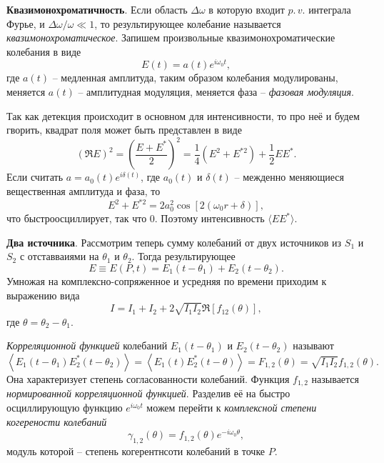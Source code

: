 

\textbf{Квазимонохроматичность}. 
Если область $\Delta \omega$ в которую входит $p.\, v.$ интеграла Фурье, и $\Delta \omega / \omega \ll 1$, то результирующее колебание называется \textit{квазимонохроматическое}. Запишем произвольные квазимонохроматические колебания в виде
\begin{equation*}
    E(t) = a(t) e^{i \omega_0 t},
\end{equation*}
где $a(t)$ -- медленная амплитуда, таким образом колебания модулированы, меняется $a(t)$ -- амплитудная модуляция, меняется фаза -- \textit{фазовая модуляция}. 


Так как детекция происходит в основном для интенсивности, то про неё и будем гворить, квадрат поля может быть представлен в виде
\begin{equation*}
    (\Re E)^2 = \left(\frac{E + E^*}{2}\right)^2 = \frac{1}{4} \left(E^2 + E^{*2}\right) + \frac{1}{2} E E^*.
\end{equation*}
Если считать $a = a_0 (t) e^{i \delta(t)}$, где $a_0(t)$ и $\delta(t)$ -- межденно меняющиеся вещественная амплитуда и фаза, то
\begin{equation*}
    E^2 + E^{*2} = 2 a_0^2 \cos\left[2(\omega_0 r + \delta)\right],
\end{equation*}
что быстроосциллирует, так что $0$. Поэтому интенсивность $\langle E E^*\rangle$. 



\textbf{Два источника}.
Рассмотрим теперь сумму колебаний от двух источников из $S_1$ и $S_2$ с отставваиями на $\theta_1$ и $\theta_2$. Тогда результирующее 
\begin{equation*}
    E \equiv E(P, t) = E_1(t-\theta_1) + E_2 (t-\theta_2).
\end{equation*}
Умножая на комплексно-сопряженное и усредняя по времени приходим к выражению вида
\begin{equation*}
    I = I_1 + I_2 + 2 \sqrt{I_1 I_2} \Re\left[f_{12}(\theta)\right],
\end{equation*}
где $\theta = \theta_2-\theta_1$. 

\begin{to_def}
    \textit{Корреляционной функцией} колебаний $E_1(t-\theta_1)$ и $E_2(t-\theta_2)$ называют 
    \begin{equation*}
        \left\langle 
            E_1(t-\theta_1) E_2^* (t-\theta_2)
        \right\rangle = \left\langle E_1(t) E_2^* (t-\theta)\right\rangle = F_{1, 2}(\theta) = \sqrt{I_1 I_2}f_{1,2} (\theta).
    \end{equation*}
    Она характеризует степень согласованности колебаний. Функция $f_{1, 2}$ называется \textit{нормированной корреляционной функцией}. Разделив её на быстро осциллирующую функцию $e^{i \omega_0 t}$ можем перейти к \textit{комплексной степени когерености колебаний}
    \begin{equation*}
        \gamma_{1,2}(\theta) = f_{1, 2} (\theta) e^{-i \omega_0 \theta},
    \end{equation*}
    модуль которой -- степень когерентнсоти колебаний в точке $P$. 
\end{to_def}



